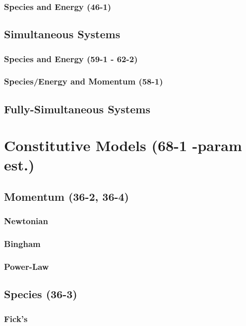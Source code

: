 \documentclass{mitqualif}
\begin{document}
\subsubsection{Species and Energy (46-1)}
\subsection{Simultaneous Systems}
\subsubsection{Species and Energy (59-1 - 62-2)}
\subsubsection{Species/Energy and Momentum (58-1)}
\subsection{Fully-Simultaneous Systems}
\section{Constitutive Models (68-1 -param est.)}
\subsection{Momentum (36-2, 36-4)}
\subsubsection{Newtonian}
\subsubsection{Bingham}
\subsubsection{Power-Law}
\subsection{Species (36-3)}
\subsubsection{Fick's}
\end{document}
